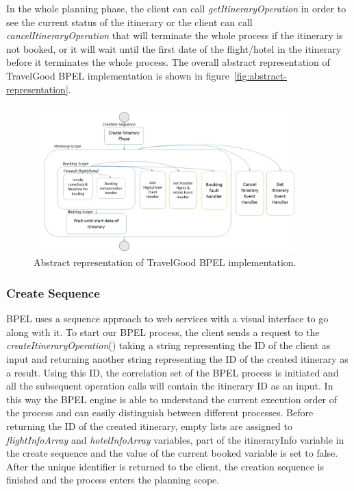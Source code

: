 In the whole planning phase, the client can call \textit{getItineraryOperation} in order to see the current status of the itinerary or the client can call \textit{cancelItineraryOperation} that will terminate the whole process if the itinerary is not booked, or it will wait until the first date of the flight/hotel in the itinerary before it terminates the whole process. The overall abstract representation of TravelGood BPEL implementation is shown in figure~\ref{fig:abstract-representation}.

\begin{figure}[H]
\centering
\includegraphics[width=0.9\textwidth]{images/bpel_abstract_impl.jpg}
\caption{Abstract representation of TravelGood BPEL implementation.} \label{fig:abstract-representation}
\label{statediagram}
\end{figure}

\subsubsection*{Create Sequence}
BPEL uses a sequence approach to web services with a visual interface to go along with it. To start our BPEL process, the client sends a request to the \textit{createItineraryOperation}() taking a string representing the ID of the client as input and returning another string representing the ID of the created itinerary as a result. Using this ID, the correlation set of the BPEL process is initiated and all the subsequent operation calls will contain the itinerary ID as an input. In this way the BPEL engine is able to understand the current execution order of the process and can easily distinguish between different processes. Before returning the ID of the created itinerary, empty lists are assigned  to \textit{flightInfoArray} and \textit{hotelInfoArray} variables, part of the itineraryInfo variable in the create sequence and the value of the current booked variable is set to false. After the unique identifier is returned to the client, the creation sequence is finished and the process enters the planning scope.

